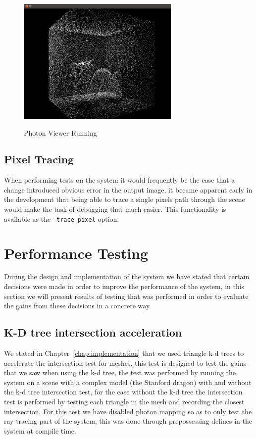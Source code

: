 \begin{figure}
\centering
\includegraphics[width=0.7\textwidth]{./images/photon_viewer.png}
\label{fig:photon_viewer}
\caption{Photon Viewer Running}
\end{figure}

\subsection{Pixel Tracing}
When performing tests on the system it would frequently be the case that a change introduced obvious error in the output image,
it became apparent early in the development that being able to trace a single pixels path through the scene would make the
task of debugging that much easier. This functionality is available as the \texttt{--trace\_pixel} option.

\section{Performance Testing}
During the design and implementation of the system we have stated that certain decisions were made in order to improve the performance
of the system, in this section we will present results of testing that was performed in order to evaluate the gains from these decisions
in a concrete way.

\subsection{K-D tree intersection acceleration}
We stated in Chapter~\ref{chap:implementation} that we used triangle k-d trees to accelerate the intersection test for
meshes, this test is designed to test the gains that we saw when using the k-d tree, the test was performed by running the
system on a scene with a complex model (the Stanford dragon) with and without the k-d tree intersection test, for the case
without the k-d tree the intersection test is performed by testing each triangle in the mesh and recording the closest intersection.
For this test we have disabled photon mapping so as to only test the ray-tracing part of the system, this was done through
prepossessing defines in the system at compile time.

